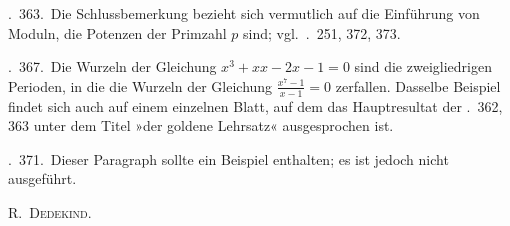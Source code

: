 \textsection.\ 363.\ Die Schlussbemerkung bezieht sich vermutlich auf die Einführung von Moduln, die Potenzen der Primzahl $p$ sind; vgl.\ \textsection\textsection.\ 251, 372, 373.

\textsection.\ 367.\ Die Wurzeln der Gleichung $x^3+xx-2x-1=0$ sind die zweigliedrigen Perioden, in die die Wurzeln der Gleichung $\frac{x^7-1}{x-1}=0$ zerfallen. Dasselbe Beispiel findet sich auch auf einem einzelnen Blatt, auf dem das Hauptresultat der \textsection\textsection.\ 362, 363 unter dem Titel »der goldene Lehrsatz« ausgesprochen ist.

\textsection.\ 371.\ Dieser Paragraph sollte ein Beispiel enthalten; es ist jedoch nicht ausgeführt.
\begin{flushright}R.\ \textsc{Dedekind}.\end{flushright}
